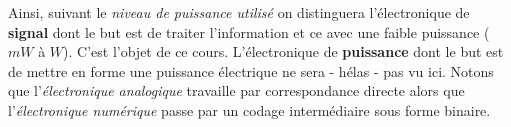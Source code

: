 Ainsi, suivant le \textit{niveau de puissance utilisé} on distinguera
l'électronique de \textbf{signal} dont le but est de traiter l'information et
ce avec une faible puissance ($mW$ à $W$). C'est l'objet de ce cours. L'électronique de \textbf{puissance} dont le but est de mettre en forme
une puissance électrique ne sera - hélas - pas vu ici. Notons que l'\textit{électronique analogique} travaille par correspondance directe alors que l'\textit{électronique numérique} passe par un codage intermédiaire sous forme binaire.